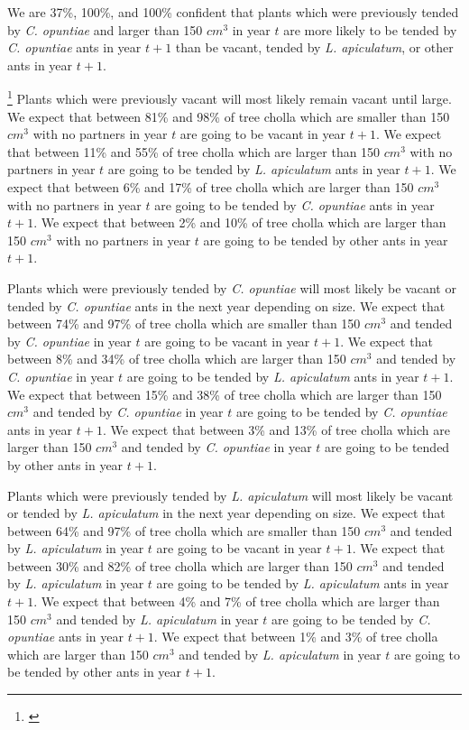 \documentclass[11pt]{article}
\newcommand{\ali}[2]{{\color{blue}{#1}}\footnote{\textit{\color{blue}{#2}}}}
\begin{document}
We are 37\%, 100\%, and 100\% confident that plants which were previously tended by \textit{C. opuntiae} and larger than 150 $cm^3$ in year $t$ are more likely to be tended by \textit{C. opuntiae} ants in year $t+1$ than be vacant, tended by \textit{L. apiculatum}, or other ants in year $t+1$.

\ali{}{Or I can do this section like this:}
Plants which were previously vacant will most likely remain vacant until large. 
We expect that between 81\% and 98\% of tree cholla which are smaller than 150 $cm^3$ with no partners in year $t$ are going to be vacant in year $t+1$.
We expect that between 11\% and 55\% of tree cholla which are larger than 150 $cm^3$ with no partners in year $t$ are going to be tended by \textit{L. apiculatum} ants in year $t+1$.
We expect that between 6\% and 17\% of tree cholla which are larger than 150 $cm^3$ with no partners in year $t$ are going to be tended by \textit{C. opuntiae} ants in year $t+1$.
We expect that between 2\% and 10\% of tree cholla which are larger than 150 $cm^3$ with no partners in year $t$ are going to be tended by other ants in year $t+1$.

Plants which were previously tended by \textit{C. opuntiae} will most likely be vacant or tended by \textit{C. opuntiae} ants in the next year depending on size. 
We expect that between 74\% and 97\% of tree cholla which are smaller than 150 $cm^3$ and tended by \textit{C. opuntiae} in year $t$ are going to be vacant in year $t+1$.
We expect that between 8\% and 34\% of tree cholla which are larger than 150 $cm^3$ and tended by \textit{C. opuntiae} in year $t$ are going to be tended by \textit{L. apiculatum} ants in year $t+1$.
We expect that between 15\% and 38\% of tree cholla which are larger than 150 $cm^3$ and tended by \textit{C. opuntiae} in year $t$ are going to be tended by \textit{C. opuntiae} ants in year $t+1$.
We expect that between 3\% and 13\% of tree cholla which are larger than 150 $cm^3$ and tended by \textit{C. opuntiae} in year $t$ are going to be tended by other ants in year $t+1$.

Plants which were previously tended by \textit{L. apiculatum} will most likely be vacant or tended by \textit{L. apiculatum} in the next year depending on size. 
We expect that between 64\% and 97\% of tree cholla which are smaller than 150 $cm^3$ and tended by \textit{L. apiculatum} in year $t$ are going to be vacant in year $t+1$.
We expect that between 30\% and 82\% of tree cholla which are larger than 150 $cm^3$ and tended by \textit{L. apiculatum} in year $t$ are going to be tended by \textit{L. apiculatum} ants in year $t+1$.
We expect that between 4\% and 7\% of tree cholla which are larger than 150 $cm^3$ and tended by \textit{L. apiculatum} in year $t$ are going to be tended by \textit{C. opuntiae} ants in year $t+1$.
We expect that between 1\% and 3\% of tree cholla which are larger than 150 $cm^3$ and tended by \textit{L. apiculatum} in year $t$ are going to be tended by other ants in year $t+1$.
\end{document}
